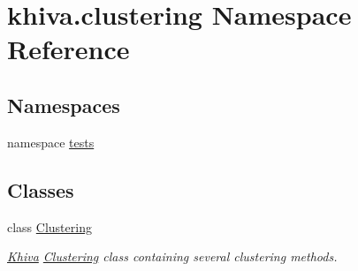 \hypertarget{namespacekhiva_1_1clustering}{}\section{khiva.\+clustering Namespace Reference}
\label{namespacekhiva_1_1clustering}
\subsection*{Namespaces}
\begin{DoxyCompactItemize}
\item 
namespace \mbox{\hyperlink{namespacekhiva_1_1clustering_1_1tests}{tests}}
\end{DoxyCompactItemize}
\subsection*{Classes}
\begin{DoxyCompactItemize}
\item 
class \mbox{\hyperlink{classkhiva_1_1clustering_1_1_clustering}{Clustering}}
\begin{DoxyCompactList}\small\item\em \mbox{\hyperlink{classkhiva_1_1_khiva}{Khiva}} \mbox{\hyperlink{classkhiva_1_1clustering_1_1_clustering}{Clustering}} class containing several clustering methods. \end{DoxyCompactList}\end{DoxyCompactItemize}
